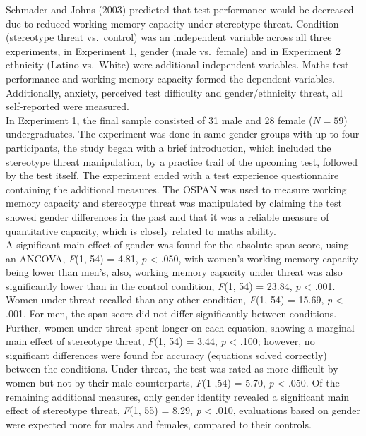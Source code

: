 \documentclass[
  stu,floatsintext]{apa7}
\begin{document}
Schmader and Johns (2003) predicted that test performance would be decreased due to reduced working memory capacity under stereotype threat.
Condition (stereotype threat vs.~control) was an independent variable across all three experiments, in Experiment 1, gender (male vs.~female) and in Experiment 2 ethnicity (Latino vs.~White) were additional independent variables.
Maths test performance and working memory capacity formed the dependent variables.
Additionally, anxiety, perceived test difficulty and gender/ethnicity threat, all self-reported were measured.\\
In Experiment 1, the final sample consisted of 31 male and 28 female (\(N = 59\)) undergraduates.
The experiment was done in same-gender groups with up to four participants, the study began with a brief introduction, which included the stereotype threat manipulation, by a practice trail of the upcoming test, followed by the test itself. The experiment ended with a test experience questionnaire containing the additional measures.
The OSPAN was used to measure working memory capacity and stereotype threat was manipulated by claiming the test showed gender differences in the past and that it was a reliable measure of quantitative capacity, which is closely related to maths ability.\\
A significant main effect of gender was found for the absolute span score, using an ANCOVA, \emph{F}(1, 54) = 4.81, \emph{p} \textless{} .050, with women's working memory capacity being lower than men's, also, working memory capacity under threat was also significantly lower than in the control condition, \emph{F}(1, 54) = 23.84, \emph{p} \textless{} .001.
Women under threat recalled than any other condition, \emph{F}(1, 54) = 15.69, \emph{p} \textless{} .001.
For men, the span score did not differ significantly between conditions.
Further, women under threat spent longer on each equation, showing a marginal main effect of stereotype threat, \emph{F}(1, 54) = 3.44, \emph{p} \textless{} .100; however, no significant differences were found for accuracy (equations solved correctly) between the conditions.
Under threat, the test was rated as more difficult by women but not by their male counterparts, \emph{F}(1 ,54) = 5.70, \emph{p} \textless{} .050.
Of the remaining additional measures, only gender identity revealed a significant main effect of stereotype threat, \emph{F}(1, 55) = 8.29, \emph{p} \textless{} .010, evaluations based on gender were expected more for males and females, compared to their controls.\\
\end{document}
